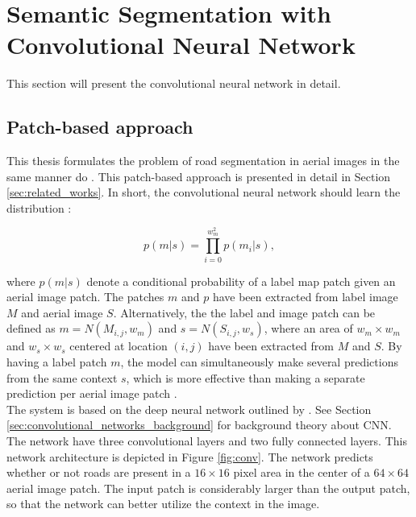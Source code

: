 \section{Semantic Segmentation with Convolutional Neural Network}
\label{sec:network}
This section will present the convolutional neural network in detail. 

\subsection{Patch-based approach}
This thesis formulates the problem of road segmentation in aerial images in the same manner  \cite{Mnih_roads_high_res_aerial_images} do . This patch-based approach is presented in detail in Section \ref{sec:related_works}. In short, the convolutional neural network should learn the distribution :

$$ p(m|s) = \prod_{i=0}^{w_m^2}p(m_i | s),  $$

where $p(m|s)$ denote a conditional probability of a label map patch given an aerial image patch. The patches $m$ and $p$ have been extracted from label image $M$ and aerial image $S$. Alternatively, the the label and image patch can be defined as $m =N(M_{i,j}, w_m)$ and $ s = N(S_{i,j}, w_s)$, where an area of $w_m \times w_m$ and $w_s \times w_s$ centered at location $(i, j)$ have been extracted from $M$ and $S$. By having a label patch $m$, the model can simultaneously make several predictions from the same context $s$, which is more effective than making a separate prediction per aerial image patch . \\ 


The system is based on the deep neural network outlined by \cite{MnihThesis}. See Section \ref{sec:convolutional_networks_background} for background theory about \ac{CNN}. The network have three convolutional layers and two fully connected layers. This network architecture is depicted in Figure \ref{fig:conv}. The network predicts whether or not roads are present in a $16 \times 16$ pixel area in the center of  a $64 \times 64$ aerial image patch. The input patch is considerably larger than the output patch, so that the network can better utilize the context in the image. \\

